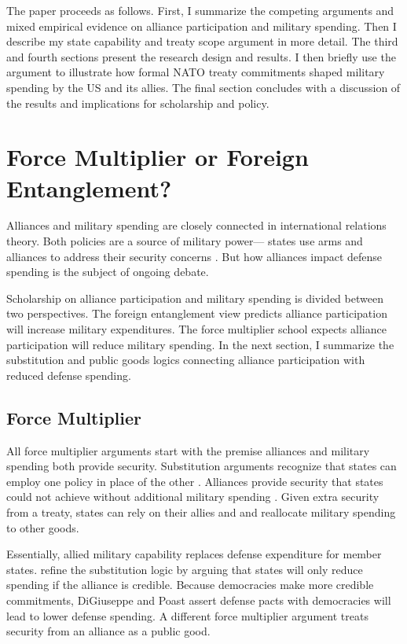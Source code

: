 \documentclass[12pt]{article}
\begin{document}
The paper proceeds as follows. 
First, I summarize the competing arguments and mixed empirical evidence on alliance participation and military spending. 
Then I describe my state capability and treaty scope argument in more detail. 
The third and fourth sections present the research design and results. 
I then briefly use the argument to illustrate how formal NATO treaty commitments shaped military spending by the US and its allies. 
The final section concludes with a discussion of the results and implications for scholarship and policy.  


\section{Force Multiplier or Foreign Entanglement?}


Alliances and military spending are closely connected in international relations theory. 
Both policies are a source of military power--- states use arms and alliances to address their security concerns \citep{Morrow1993}. 
But how alliances impact defense spending is the subject of ongoing debate. 

Scholarship on alliance participation and military spending is divided between two perspectives. 
The foreign entanglement view predicts alliance participation will increase military expenditures.
The force multiplier school expects alliance participation will reduce military spending. 
In the next section, I summarize the substitution and public goods logics connecting alliance participation with reduced defense spending. 


\subsection{Force Multiplier} 


All force multiplier arguments start with the premise alliances and military spending both provide security.
Substitution arguments recognize that states can employ one policy in place of the other \citep{MostStarr1989}.  
Alliances provide security that states could not achieve without additional military spending \citep{Morrow1993, Conybeare1994}. 
Given extra security from a treaty, states can rely on their allies and and reallocate military spending to other goods. 


Essentially, allied military capability replaces defense expenditure for member states. 
\citet{DigiuseppePoast2016} refine the substitution logic by arguing that states will only reduce spending if the alliance is credible. 
Because democracies make more credible commitments, DiGiuseppe and Poast assert defense pacts with democracies will lead to lower defense spending. 
A different force multiplier argument treats security from an alliance as a public good. 
\end{document}
